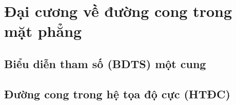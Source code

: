 \chapter{Đại cương về đường cong trong mặt phẳng}
\section{Biểu diễn tham số (BDTS) một cung}
\section{Đường cong trong hệ tọa độ cực (HTĐC)}